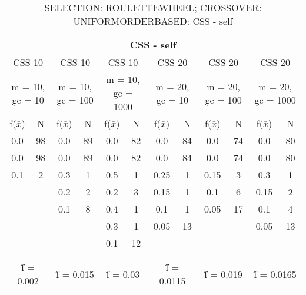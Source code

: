 \begin{table}[H]
	\centering
	\caption{SELECTION: ROULETTEWHEEL; CROSSOVER: UNIFORMORDERBASED: CSS - self}
	\begin{adjustbox}{width=1\textwidth}
		\begin{tabular}{ |c|c||c|c||c|c||c|c||c|c||c|c| }
			\hline
			\multicolumn{12}{|c|}{CSS - self} \\
			\hline
			\multicolumn{2}{|c||}{CSS-10} & \multicolumn{2}{c||}{CSS-10} & \multicolumn{2}{c||}{CSS-10} & \multicolumn{2}{c||}{CSS-20} & \multicolumn{2}{c||}{CSS-20} & \multicolumn{2}{c|}{CSS-20}\\
			\hline
			\multicolumn{2}{|c||}{m = 10, gc = 10} & \multicolumn{2}{c||}{m = 10, gc = 100} & \multicolumn{2}{c||}{m = 10, gc = 1000} & \multicolumn{2}{c||}{m = 20, gc = 10} & \multicolumn{2}{c||}{m = 20, gc = 100} & \multicolumn{2}{c|}{m = 20, gc = 1000}\\
			\hline
			f($\bar{x}$) & N & f($\bar{x}$) & N & f($\bar{x}$) & N & f($\bar{x}$) & N & f($\bar{x}$) & N & f($\bar{x}$) & N\\
			\hline
			\hline
			0.0 & 98 & 0.0 & 89 & 0.0 & 82 & 0.0 & 84 & 0.0 & 74 & 0.0 & 80\\
			\hline
			0.0 & 98 & 0.0 & 89 & 0.0 & 82 & 0.0 & 84 & 0.0 & 74 & 0.0 & 80\\
			0.1 & 2 & 0.3 & 1 & 0.5 & 1 & 0.25 & 1 & 0.15 & 3 & 0.3 & 1\\
			&   & 0.2 & 2 & 0.2 & 3 & 0.15 & 1 & 0.1 & 6 & 0.15 & 2\\
			&   & 0.1 & 8 & 0.4 & 1 & 0.1 & 1 & 0.05 & 17 & 0.1 & 4\\
			&   &   &   & 0.3 & 1 & 0.05 & 13 &   &   & 0.05 & 13\\
			&   &   &   & 0.1 & 12 &   &   &   &   &   &  \\
			&   &   &   &   &   &   &   &   &   &   &  \\
			&   &   &   &   &   &   &   &   &   &   &  \\
			\hline
			\multicolumn{2}{|c||}{\^{f} = 0.002} & \multicolumn{2}{c||}{\^{f} = 0.015} & \multicolumn{2}{c||}{\^{f} = 0.03} & \multicolumn{2}{c||}{\^{f} = 0.0115} & \multicolumn{2}{c||}{\^{f} = 0.019} & \multicolumn{2}{c|}{\^{f} = 0.0165}\\
			\hline
		\end{tabular}
	\end{adjustbox}
\end{table}
